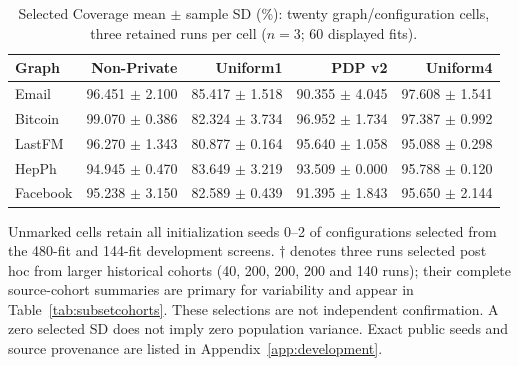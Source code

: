 \begin{table}[htbp]
\centering\small
\caption{Selected Coverage mean $\pm$ sample SD (\%): twenty graph/configuration cells, three retained runs per cell ($n=3$; 60 displayed fits).}\label{tab:coverage}
\begin{tabular}{lrrrr}
\toprule
Graph & Non-Private & Uniform1 & PDP v2 & Uniform4\\ \midrule
Email & 96.451 $\pm$ 2.100 & 85.417 $\pm$ 1.518 & 90.355 $\pm$ 4.045 & 97.608 $\pm$ 1.541 \\
Bitcoin & 99.070 $\pm$ 0.386 & 82.324 $\pm$ 3.734 & 96.952 $\pm$ 1.734 & 97.387 $\pm$ 0.992 \\
LastFM & 96.270 $\pm$ 1.343 & 80.877 $\pm$ 0.164 & 95.640 $\pm$ 1.058 & 95.088 $\pm$ 0.298 \\
HepPh & 94.945 $\pm$ 0.470 & 83.649 $\pm$ 3.219 & 93.509 $\pm$ 0.000 & 95.788 $\pm$ 0.120 \\
Facebook & 95.238 $\pm$ 3.150 & 82.589 $\pm$ 0.439 & 91.395 $\pm$ 1.843 & 95.650 $\pm$ 2.144 \\
\bottomrule\end{tabular}
\par\vspace{3pt}\begin{minipage}{.97\textwidth}\footnotesize Unmarked cells retain all initialization seeds 0--2 of configurations selected from the 480-fit and 144-fit development screens. $\dagger$ denotes three runs selected post hoc from larger historical cohorts (40, 200, 200, 200 and 140 runs); their complete source-cohort summaries are primary for variability and appear in Table~\ref{tab:subsetcohorts}. These selections are not independent confirmation. A zero selected SD does not imply zero population variance. Exact public seeds and source provenance are listed in Appendix~\ref{app:development}.\end{minipage}
\end{table}

